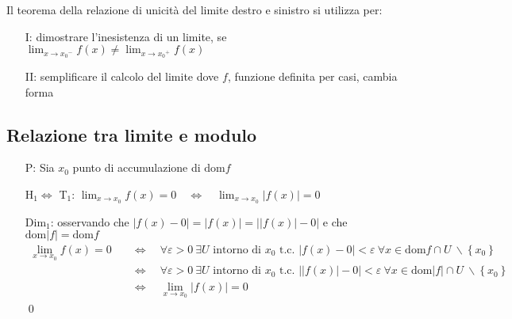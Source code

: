 \documentclass[a4paper]{article}
\newcommand\dom{\text{dom}}
\begin{document}
Il teorema della relazione di unicità del limite destro e sinistro si utilizza per:
\begin{itemize}
	\item[I: ] dimostrare l'inesistenza di un limite, se \(\displaystyle \lim_{x \to {x_0}^- } f(x) \neq \lim_{x \to {x_0}^+} f(x)\)
	\item[II: ] semplificare il calcolo del limite dove \(f\), funzione definita per casi, cambia forma
\end{itemize}

\subsection{Relazione tra limite e modulo}
\begin{itemize}
	\item[P: ] Sia \(x_0\) punto di accumulazione di \(\dom f\)
	\item[H\(_1 \Leftrightarrow\) T\(_1\): ] \(\displaystyle \lim_{x \to x_0} f(x) = 0 \quad \Leftrightarrow \quad \lim_{x \to x_0} \left| f(x) \right| = 0\)
	\item[Dim\(_1\): ] osservando che \(\left| f(x) - 0 \right| = \left| f(x) \right| = \left| \left| f(x) \right| - 0 \right|\) e che \(\dom \left| f \right| = \dom f\)
	\begin{align*}
		\lim_{x \to x_0} f(x) = 0 \quad &\Leftrightarrow \quad \forall \varepsilon > 0 \  \exists U \text{ intorno di } x_0 \text{ t.c. } \left| f(x) - 0 \right| < \varepsilon \  \forall x \in \dom f \cap U \  \backslash \left\{ x_0 \right\} \\
		&\Leftrightarrow \quad \forall \varepsilon > 0 \  \exists U \text{ intorno di } x_0 \text{ t.c. } \left| \left| f(x) \right| - 0 \right| < \varepsilon \  \forall x \in \dom \left| f \right| \cap U \  \backslash \left\{ x_0 \right\} \\
		&\Leftrightarrow \quad \lim_{x \to x_0} \left| f(x) \right| = 0
	\end{align*} \qed
	

\end{itemize}
\end{document}
